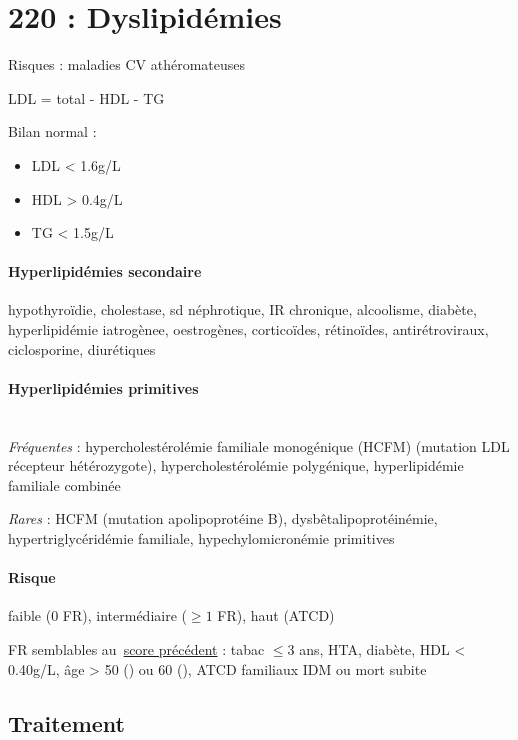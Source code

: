 \documentclass{article}
\begin{document}
\section{220 : Dyslipidémies}%
\label{sec:220_dyslipidemies}

Risques : maladies CV athéromateuses

LDL = total - HDL - \gls{TG}

Bilan normal : \begin{itemize}
  \item LDL  < 1.6g/L
  \item HDL  > 0.4g/L
  \item TG  < 1.5g/L
\end{itemize}

\paragraph{Hyperlipidémies secondaire } hypothyroïdie, cholestase, sd néphrotique, IR chronique, alcoolisme,
diabète, hyperlipidémie iatrogènee, oestrogènes, corticoïdes, rétinoïdes,
antirétroviraux, ciclosporine, diurétiques

\paragraph{Hyperlipidémies primitives}\mbox{}\\
\textit{Fréquentes}  : hypercholestérolémie familiale monogénique (HCFM) (mutation LDL récepteur
hétérozygote), hypercholestérolémie polygénique, hyperlipidémie familiale
combinée

\textit{Rares}  : HCFM (mutation apolipoprotéine B),
dysbêtalipoprotéinémie, hypertriglycéridémie familiale, hypechylomicronémie
primitives

\paragraph{Risque} faible (0 FR), intermédiaire ($\ge 1$ FR), haut (ATCD)

FR semblables au~\hyperref[subsec:fr]{score précédent} : tabac $\le 3$ ans, HTA, diabète, HDL < 0.40g/L, âge > 50
(\male) ou 60 (\female), ATCD familiaux IDM ou mort subite

\subsection{Traitement}
\end{document}
